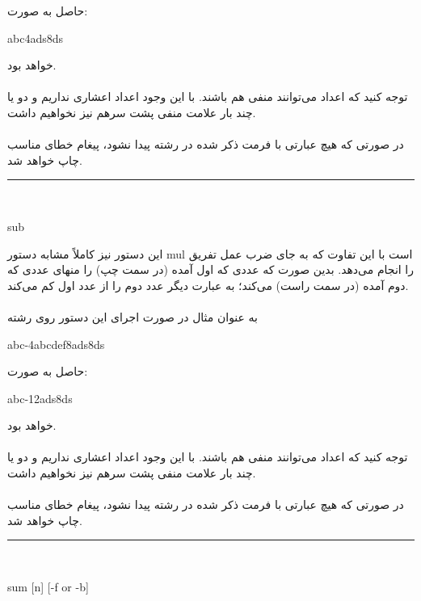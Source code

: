 \documentclass[]{article}
\begin{document}
حاصل به صورت:
\begin{tcolorbox}[boxrule=0pt]
	\begin{latin}
  	  \large{
  	  	abc4ads8ds
		}
	\end{latin}
\end{tcolorbox}
خواهد بود.\\\\
توجه کنید که اعداد می‌توانند منفی هم باشند. با این وجود اعداد اعشاری نداریم و دو یا چند بار علامت منفی پشت سرهم نیز نخواهیم داشت.\\\\
در صورتی که هیچ عبارتی با فرمت ذکر شده در رشته پیدا نشود، پیغام خطای مناسب چاپ خواهد شد.\\
\noindent\rule[0.5ex]{\linewidth}{1pt}\\
\begin{tcolorbox}[boxrule=0pt]
	\begin{latin}
  	  \large{
  	  	sub
		}
	\end{latin}
\end{tcolorbox}
این دستور نیز کاملاً مشابه دستور mul است با این تفاوت که به جای ضرب عمل تفریق را انجام می‌دهد. بدین صورت که عددی که اول آمده (در سمت چپ) را منهای عددی که دوم آمده (در سمت راست) می‌کند؛ به عبارت دیگر عدد دوم را از عدد اول کم می‌کند.\\\\
به عنوان مثال در صورت اجرای این دستور روی رشته
\begin{tcolorbox}[boxrule=0pt]
	\begin{latin}
  	  \large{
		abc-4abcdef8ads8ds
		}
	\end{latin}
\end{tcolorbox}
حاصل به صورت:
\begin{tcolorbox}[boxrule=0pt]
	\begin{latin}
  	  \large{
  	  	abc-12ads8ds
		}
	\end{latin}
\end{tcolorbox}
خواهد بود.\\\\
توجه کنید که اعداد می‌توانند منفی هم باشند. با این وجود اعداد اعشاری نداریم و دو یا چند بار علامت منفی پشت سرهم نیز نخواهیم داشت.\\\\
در صورتی که هیچ عبارتی با فرمت ذکر شده در رشته پیدا نشود، پیغام خطای مناسب چاپ خواهد شد.\\
\noindent\rule[0.5ex]{\linewidth}{1pt}\\
\begin{tcolorbox}[boxrule=0pt]
	\begin{latin}
  	  \large{
  	  	sum [n] [-f or -b]
		}
	\end{latin}
\end{tcolorbox}
\end{document}
